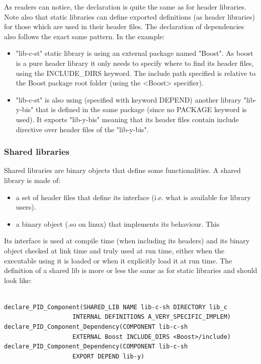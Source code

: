 \documentclass[12pt,a4paper]{article}
\begin{document}
As readers can notice, the declaration is quite the same as for header libraries. Note also that static libraries can define exported definitions (as header libraries) for those which are used in their header files. The declaration of dependencies also follows the exact same pattern. In the example:
\begin{itemize}
\item "lib-c-st" static library is using an external package named "Boost". As boost is a pure header library it only needs to specify where to find its header files, using the INCLUDE\_DIRS keyword. The include path specified is relative to the Boost package root folder (using the <Boost> specifier).
\item "lib-c-st" is also using (specified with keyword DEPEND) another library "lib-y-bis" that is defined in the same package (since no PACKAGE keyword is used). It exports "lib-y-bis" meaning that its header files contain include directive over header files of the "lib-y-bis".
\end{itemize}


\subsubsection{Shared libraries}
\label{sec:libCMakeShared}

Shared libraries are binary objects that define some functionalities. A shared library is made of:
\begin{itemize}
\item a set of header files that define its interface (i.e. what is available for library users).
\item a binary object (.so on linux) that implements its behaviour. This 
\end{itemize}
Its interface is used at compile time (when including its headers) and its binary object checked at link time and truly used at run time, either when the executable using it is loaded or when it explicitly load it at run time. The definition of a shared lib is more or less the same as for static libraries and should look like:

\begin{verbatim}

declare_PID_Component(SHARED_LIB NAME lib-c-sh DIRECTORY lib_c
                   INTERNAL DEFINITIONS A_VERY_SPECIFIC_IMPLEM)
declare_PID_Component_Dependency(COMPONENT lib-c-sh
                   EXTERNAL Boost INCLUDE_DIRS <Boost>/include)
declare_PID_Component_Dependency(COMPONENT lib-c-sh
                   EXPORT DEPEND lib-y)

\end{verbatim}
\end{document}
